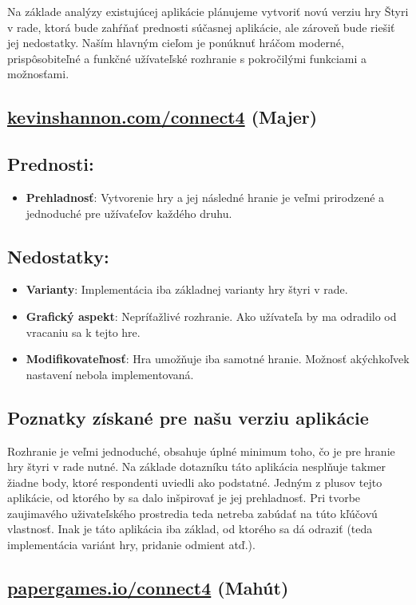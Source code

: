 \documentclass[a4paper, 11pt, onecolumn]{article}
\begin{document}
Na základe analýzy existujúcej aplikácie plánujeme vytvoriť novú verziu hry 
Štyri v rade, ktorá bude zahŕňať prednosti súčasnej aplikácie, ale zároveň 
bude riešiť jej nedostatky. Naším hlavným cieľom je ponúknuť hráčom moderné, 
prispôsobiteľné a funkčné užívateľské rozhranie s pokročilými funkciami 
a možnosťami.
\subsection{ \href{https://kevinshannon.com/connect4/}{kevinshannon.com/connect4} (Majer)}
\subsection*{Prednosti:}
\begin{itemize}
  \item \textbf{Prehladnosť}: Vytvorenie hry a jej následné hranie je veľmi prirodzené a jednoduché pre užívaťeľov každého druhu.
\end{itemize}
\subsection*{Nedostatky:}
\begin{itemize}
  \item \textbf{Varianty}: Implementácia iba základnej varianty hry štyri v rade.
  \item \textbf{Grafický aspekt}: Nepríťažlivé rozhranie. Ako užívateľa by ma odradilo od vracaniu sa k tejto hre.
  \item \textbf{Modifikovateľnosť}: Hra umožňuje iba samotné hranie. Možnosť akýchkoľvek nastavení nebola implementovaná.
\end{itemize}
\subsection*{Poznatky získané pre našu verziu aplikácie}
Rozhranie je veľmi jednoduché, obsahuje úplné minimum toho, čo je pre hranie hry štyri v rade nutné. Na základe dotazníku táto
aplikácia nesplňuje takmer žiadne body, ktoré respondenti uviedli ako podstatné. Jedným z plusov tejto aplikácie, od ktorého by
sa dalo inšpirovať je jej prehladnosť. Pri tvorbe zaujimavého uživateľského prostredia teda netreba zabúdať na túto kľúčovú
vlastnosť. Inak je táto aplikácia iba základ, od ktorého sa dá odraziť (teda implementácia variánt hry, pridanie odmient atď.).
\subsection{ \href{https://papergames.io/en/connect4}{papergames.io/connect4} (Mahút)}
\end{document}
